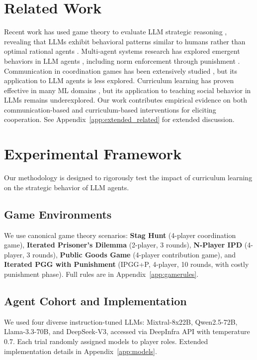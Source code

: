 \documentclass[11pt]{article}
\begin{document}
\section{Related Work}
Recent work has used game theory to evaluate LLM strategic reasoning \citep{sun2025survey, guo2024investigation}, revealing that LLMs exhibit behavioral patterns similar to humans rather than optimal rational agents \citep{pnas2024ai_behavioral_science, payne2025fingerprints}. Multi-agent systems research has explored emergent behaviors in LLM agents \citep{wu2023autogen, alympics_paper}, including norm enforcement through punishment \citep{fehr2002altruistic}. Communication in coordination games has been extensively studied \citep{skyrms2004stag}, but its application to LLM agents is less explored. Curriculum learning has proven effective in many ML domains \citep{bengio2009curriculum}, but its application to teaching social behavior in LLMs remains underexplored. Our work contributes empirical evidence on both communication-based and curriculum-based interventions for eliciting cooperation. See Appendix~\ref{app:extended_related} for extended discussion.

\section{Experimental Framework}
Our methodology is designed to rigorously test the impact of curriculum learning on the strategic behavior of LLM agents.

\subsection{Game Environments}
We use canonical game theory scenarios: \textbf{Stag Hunt} (4-player coordination game), \textbf{Iterated Prisoner's Dilemma} (2-player, 3 rounds), \textbf{N-Player IPD} (4-player, 3 rounds), \textbf{Public Goods Game} (4-player contribution game), and \textbf{Iterated PGG with Punishment} (IPGG+P, 4-player, 10 rounds, with costly punishment phase). Full rules are in Appendix~\ref{app:gamerules}.


\subsection{Agent Cohort and Implementation}
We used four diverse instruction-tuned LLMs: Mixtral-8x22B, Qwen2.5-72B, Llama-3.3-70B, and DeepSeek-V3, accessed via DeepInfra API with temperature 0.7. Each trial randomly assigned models to player roles. Extended implementation details in Appendix~\ref{app:models}.
\end{document}
